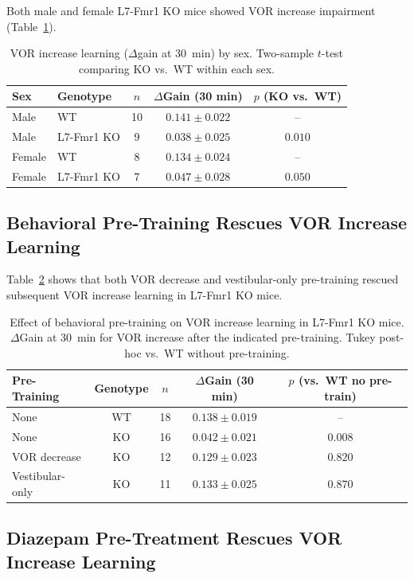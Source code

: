 \documentclass[11pt]{article}
\begin{document}
Both male and female L7-Fmr1 KO mice showed VOR increase impairment (Table~\ref{tab:sex_diff}).

\begin{table}[H]
\centering
\caption{VOR increase learning ($\Delta$gain at 30~min) by sex. Two-sample $t$-test comparing KO vs.\ WT within each sex.}
\label{tab:sex_diff}
\begin{tabular}{llccc}
\toprule
Sex & Genotype & $n$ & $\Delta$Gain (30 min) & $p$ (KO vs.\ WT) \\
\midrule
Male & WT & 10 & $0.141 \pm 0.022$ & -- \\
Male & L7-Fmr1 KO & 9 & $0.038 \pm 0.025$ & $0.010$ \\
Female & WT & 8 & $0.134 \pm 0.024$ & -- \\
Female & L7-Fmr1 KO & 7 & $0.047 \pm 0.028$ & $0.050$ \\
\bottomrule
\end{tabular}
\end{table}

\subsection{Behavioral Pre-Training Rescues VOR Increase Learning}

Table~\ref{tab:pretraining} shows that both VOR decrease and vestibular-only pre-training rescued subsequent VOR increase learning in L7-Fmr1 KO mice.

\begin{table}[H]
\centering
\caption{Effect of behavioral pre-training on VOR increase learning in L7-Fmr1 KO mice. $\Delta$Gain at 30~min for VOR increase after the indicated pre-training. Tukey post-hoc vs.\ WT without pre-training.}
\label{tab:pretraining}
\begin{tabular}{lcccc}
\toprule
Pre-Training & Genotype & $n$ & $\Delta$Gain (30 min) & $p$ (vs.\ WT no pre-train) \\
\midrule
None & WT & 18 & $0.138 \pm 0.019$ & -- \\
None & KO & 16 & $0.042 \pm 0.021$ & $0.008$ \\
VOR decrease & KO & 12 & $0.129 \pm 0.023$ & $0.820$ \\
Vestibular-only & KO & 11 & $0.133 \pm 0.025$ & $0.870$ \\
\bottomrule
\end{tabular}
\end{table}

\subsection{Diazepam Pre-Treatment Rescues VOR Increase Learning}
\end{document}

